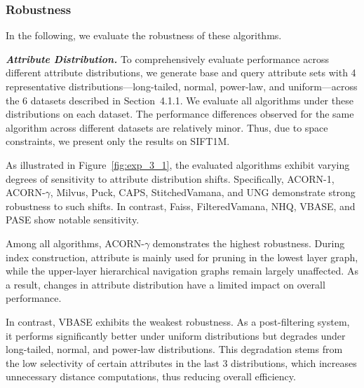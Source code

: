 \documentclass[sigconf, nonacm]{acmart}
\begin{document}
	
	
	
	\subsubsection{Robustness}In the following, we evaluate the robustness of these algorithms.
	
	\textit{\textbf{Attribute Distribution.}} To comprehensively evaluate performance across different attribute distributions, we generate base and query attribute sets with 4 representative distributions—long-tailed, normal, power-law, and uniform—across the 6 datasets described in Section~4.1.1. We evaluate all algorithms under these distributions on each dataset. The performance differences observed for the same algorithm across different datasets are relatively minor. Thus, due to space constraints, we present only the results on SIFT1M.
	
	As illustrated in Figure~\ref{fig:exp_3_1}, the evaluated algorithms exhibit varying degrees of sensitivity to attribute distribution shifts. Specifically, ACORN-1, ACORN-$\gamma$, Milvus, Puck, CAPS, StitchedVamana, and UNG demonstrate strong robustness to such shifts. In contrast, Faiss, FilteredVamana, NHQ, VBASE, and PASE show notable sensitivity.
	
	Among all algorithms, ACORN-\(\gamma\) demonstrates the highest robustness. During index construction, attribute is mainly used for pruning in the lowest layer graph, while the upper-layer hierarchical navigation graphs remain largely unaffected. As a result, changes in attribute distribution have a limited impact on overall performance.
	
	In contrast, VBASE exhibits the weakest robustness. As a post-filtering system, it performs significantly better under uniform distributions but degrades under long-tailed, normal, and power-law distributions. This degradation stems from the low selectivity of certain attributes in the last 3 distributions, which increases unnecessary distance computations, thus reducing overall efficiency.
	
\end{document}
